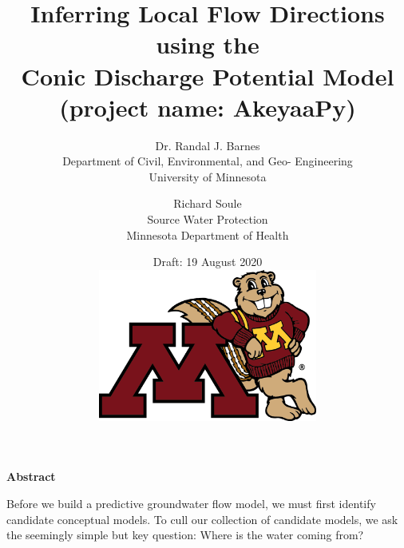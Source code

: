 \documentclass[12pt]{report}
\newcommand{\version}{Draft: 19 August 2020}
\begin{document}

\thispagestyle{empty}

\title{Inferring Local Flow Directions using the\\Conic Discharge Potential Model\\(project name: {\bf AkeyaaPy})}
\author{
Dr. Randal J. Barnes\\
Department of Civil, Environmental, and Geo- Engineering\\
University of Minnesota
\and
Richard Soule\\
Source Water Protection\\
Minnesota Department of Health\\
}

\date{\version
\\
\vspace{1.5in}
\includegraphics[height=5.0cm]{figures/goldyMout-RGB.png}
}
\maketitle
\thispagestyle{plain}


\null\vspace{1.0in}
\begin{center}
    \Large\bf{Abstract}
\end{center}

Before we build a predictive groundwater flow model, we must first identify candidate conceptual models. To cull our collection of candidate models, we ask the seemingly simple but key question: Where is the water coming from?
\end{document}
